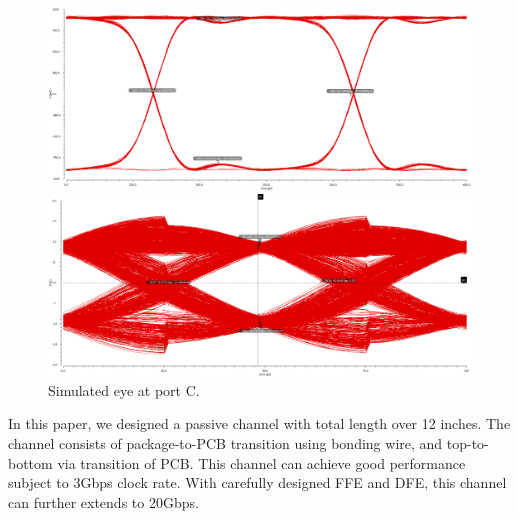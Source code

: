 \documentclass{book}  %
\renewcommand{\section}[1]{\psection{#1}}
\begin{document}
\begin{paper}
\begin{figure}[htbp!]
	\captionsetup[subfigure]{justification=centering}
	\begin{minipage}[tb]{0.5\textwidth}
		\centering	
		\includegraphics[width=\textwidth]{./img/channel_response_eye_diagram/3gbp_eye_total.png}
	\end{minipage}%
	\begin{minipage}[tb]{0.5\textwidth}
		\centering	
		\includegraphics[width=\textwidth]{./img/channel_response_eye_diagram/20gbp_eye_total.png}
	\end{minipage}%
	\label{fig:eye_total_port_C}
	\caption{Simulated eye at port C. }
\end{figure}

\section{Conclusion}
In this paper, we designed a passive channel with total length over 12 inches. The channel consists of package-to-PCB transition using bonding wire, and top-to-bottom via transition of PCB. This channel can achieve good performance subject to 3Gbps clock rate. With carefully designed FFE and DFE, this channel can further extends to 20Gbps. 





%

\end{paper}
\end{document}
